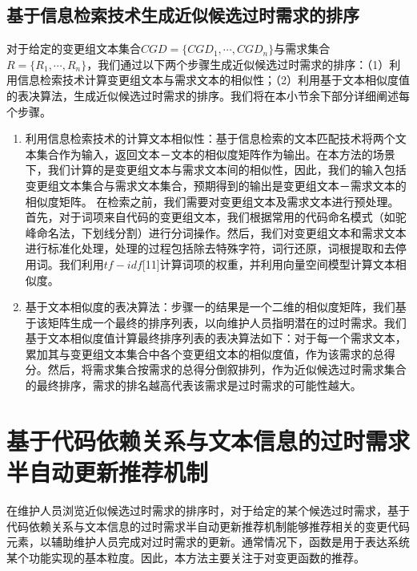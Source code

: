\subsection{基于信息检索技术生成近似候选过时需求的排序}
对于给定的变更组文本集合$CGD = \{CGD_{1}, \cdots, CGD_{n}\}$与需求集合$R = \{R_{1}, \cdots, R_{n}\}$，我们通过以下两个步骤生成近似候选过时需求的排序：（1）利用信息检索技术计算变更组文本与需求文本的相似性；（2）利用基于文本相似度值的表决算法，生成近似候选过时需求的排序。我们将在本小节余下部分详细阐述每个步骤。
\begin{enumerate}
  \item 利用信息检索技术的计算文本相似性：基于信息检索的文本匹配技术将两个文本集合作为输入，返回文本－文本的相似度矩阵作为输出。在本方法的场景下，我们计算的是变更组文本与需求文本间的相似性，因此，我们的输入包括变更组文本集合与需求文本集合，预期得到的输出是变更组文本－需求文本的相似度矩阵。 在检索之前，我们需要对变更组文本及需求文本进行预处理。首先，对于词项来自代码的变更组文本，我们根据常用的代码命名模式（如驼峰命名法，下划线分割）进行分词操作。然后，我们对变更组文本和需求文本进行标准化处理，处理的过程包括除去特殊字符，词行还原，词根提取和去停用词。我们利用$tf-idf$[11]计算词项的权重，并利用向量空间模型计算文本相似度。

  \item 基于文本相似度的表决算法：步骤一的结果是一个二维的相似度矩阵，我们基于该矩阵生成一个最终的排序列表，以向维护人员指明潜在的过时需求。我们基于文本相似度值计算最终排序列表的表决算法如下：对于每一个需求文本，累加其与变更组文本集合中各个变更组文本的相似度值，作为该需求的总得分。然后，将需求集合按需求的总得分倒叙排列，作为近似候选过时需求集合的最终排序，需求的排名越高代表该需求是过时需求的可能性越大。
\end{enumerate}

\section{基于代码依赖关系与文本信息的过时需求半自动更新推荐机制}
在维护人员浏览近似候选过时需求的排序时，对于给定的某个候选过时需求，基于代码依赖关系与文本信息的过时需求半自动更新推荐机制能够推荐相关的变更代码元素，以辅助维护人员完成对过时需求的更新。通常情况下，函数是用于表达系统某个功能实现的基本粒度。因此，本方法主要关注于对变更函数的推荐。

